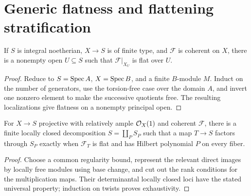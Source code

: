 \section{Generic flatness and flattening stratification}
\begin{theorem}\label{fga-thm-5-12}
If $S$ is integral noetherian, $X\to S$ is of finite type, and $\mathcal F$ is
coherent on $X$, there is a nonempty open $U\subseteq S$ such that
$\mathcal F|_{X_U}$ is flat over $U$.
\end{theorem}
\begin{proof}
Reduce to $S=\operatorname{Spec} A$, $X=\operatorname{Spec} B$, and a finite $B$-module $M$.  Induct on
the number of generators, use the torsion-free case over the domain $A$, and
invert one nonzero element to make the successive quotients free.  The resulting
localizations give flatness on a nonempty principal open.
\end{proof}
\begin{theorem}\label{fga-thm-5-13}
For $X\to S$ projective with relatively ample $\mathcal O_X(1)$ and coherent
$\mathcal F$, there is a finite locally closed decomposition
$S=\coprod_P S_P$ such that a map $T\to S$ factors through $S_P$ exactly when
$\mathcal F_T$ is flat and has Hilbert polynomial $P$ on every fiber.
\end{theorem}
\begin{proof}
Choose a common regularity bound, represent the relevant direct images by
locally free modules using base change, and cut out the rank conditions for the
multiplication maps.  Their determinantal locally closed loci have the stated
universal property; induction on twists proves exhaustivity.
\end{proof}

